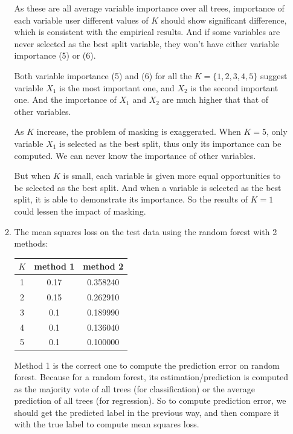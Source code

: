 \documentclass[paper=letter, fontsize=12pt]{article}
\begin{document}
\begin{enumerate}[label=(\alph*)]
\begin{enumerate}[label=(\roman*)]
		As these are all average variable importance over all trees, importance of each variable user different values of $K$ should show significant difference, which is consistent with the empirical results. And if some variables are never selected as the best split variable, they won't have either variable importance (5) or (6).
		
		Both variable importance (5) and (6) for all the $K = \{1, 2, 3, 4, 5\}$ suggest variable $X_1$ is the most important one, and $X_2$ is the second important one. And the importance of $X_1$ and $X_2$ are much higher that that of other variables.
		
		As $K$ increase, the problem of masking is exaggerated. When $K = 5$, only variable $X_1$ is selected as the best split, thus only its importance can be computed. We can never know the importance of other variables.
		
		But when $K$ is small, each variable is given more equal opportunities to be selected as the best split. And when a variable is selected as the best split, it is able to demonstrate its importance. So the results of $K = 1$ could lessen the impact of masking.
		
		\item The mean squares loss on the test data using the random forest with 2 methods:
		
		\begin{center}
			\begin{tabular}{|c|c|c|}
				\hline
				$K$ & method 1 & method 2 \\ \hline
				1 & 0.17  & 0.358240 \\ \hline
				2 & 0.15 & 0.262910 \\ \hline
				3 & 0.1 & 0.189990 \\ \hline
				4 & 0.1  & 0.136040 \\ \hline
				5 & 0.1  & 0.100000	 \\ \hline
			\end{tabular}
		\end{center}
		
		Method 1 is the correct one to compute the prediction error on random forest. Because for a random forest, its estimation/prediction is computed as the majority vote of all trees (for classification) or the average prediction of all trees (for regression). So to compute prediction error, we should get the predicted label in the previous way, and then compare it with the true label to compute mean squares loss.
	\end{enumerate}


\end{enumerate}
\end{document}
